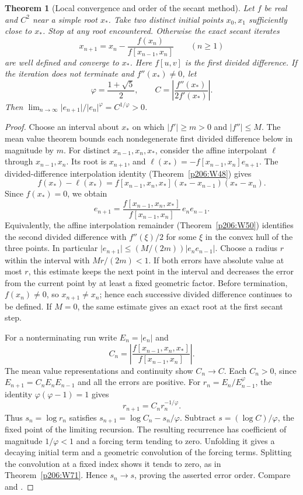 \documentclass[11pt,oneside,openany]{book}
\theoremstyle{plain}
\newtheorem{theorem}{Theorem}[chapter]
\theoremstyle{definition}
\theoremstyle{remark}
\begin{document}
\begin{theorem}[Local convergence and order of the secant method]\label{p206:W75}
Let \(f\) be real and \(C^2\) near a simple root \(x_*\).
Take two distinct initial points \(x_0,x_1\) sufficiently close to
\(x_*\). Stop at any root encountered. Otherwise the exact
secant iterates
\[
 x_{n+1}=x_n-\frac{f(x_n)}{f[x_{n-1},x_n]}
 \qquad (n\ge1)
\]
are well defined and converge to \(x_*\). Here \(f[u,v]\) is
the first divided difference. If the iteration does not terminate
and \(f''(x_*)\ne0\), let
\[
 \varphi=\frac{1+\sqrt5}{2},\qquad
 C=\left|\frac{f''(x_*)}{2 f'(x_*)}\right|.
\]
Then
\(\lim_{n\to\infty}\lvert e_{n+1}\rvert/\lvert e_n\rvert^\varphi
 =C^{1/\varphi}>0\).
\end{theorem}
\begin{proof}
Choose an interval about \(x_*\) on which \(\lvert f'\rvert\ge m>0\)
and \(\lvert f''\rvert\le M\). The mean value theorem bounds each
nondegenerate first divided difference below in magnitude by \(m\).
For distinct \(x_{n-1},x_n,x_*\), consider the affine interpolant
\(\ell\) through \(x_{n-1},x_n\). Its root is \(x_{n+1}\), and
\(\ell(x_*)=-f[x_{n-1},x_n]e_{n+1}\).
The divided-difference interpolation identity
(Theorem~\ref{p206:W48}) gives
\[
 f(x_*)-\ell(x_*)
   = f[x_{n-1},x_n,x_*](x_*-x_{n-1})(x_*-x_n).
\]
Since \(f(x_*)=0\), we obtain
\[
 e_{n+1}
 =\frac{f[x_{n-1},x_n,x_*]}{f[x_{n-1},x_n]}\,e_n e_{n-1}.
\]
Equivalently, the affine interpolation remainder
(Theorem~\ref{p206:W50}) identifies the second divided difference
with \(f''(\xi)/2\) for some \(\xi\) in the convex hull of the three
points. In particular
\(\lvert e_{n+1}\rvert\le (M/(2m))\lvert e_n e_{n-1}\rvert\).
Choose a radius \(r\) within the interval with \(Mr/(2m)<1\).
If both errors have absolute value at most \(r\), this estimate
keeps the next point in the interval and decreases the error from
the current point by at least a fixed geometric factor. Before
termination, \(f(x_n)\ne0\), so \(x_{n+1}\ne x_n\); hence each
successive divided difference continues to be defined. If \(M=0\),
the same estimate gives an exact root at the first secant step.

For a nonterminating run write \(E_n=\lvert e_n\rvert\) and
\[
 C_n=\left|\frac{f[x_{n-1},x_n,x_*]}{f[x_{n-1},x_n]}\right|.
\]
The mean value representations and continuity show \(C_n\to C\).
Each \(C_n>0\), since \(E_{n+1}=C_nE_nE_{n-1}\) and all the errors
are positive. For \(r_n=E_n/E_{n-1}^{\varphi}\), the identity
\(\varphi(\varphi-1)=1\) gives
\[
 r_{n+1}=C_n r_n^{-1/\varphi}.
\]
Thus \(s_n=\log r_n\) satisfies
\(s_{n+1}=\log C_n-s_n/\varphi\). Subtract
\(s=(\log C)/\varphi\), the fixed point of the limiting recursion.
The resulting recurrence has coefficient of magnitude \(1/\varphi<1\)
and a forcing term tending to zero. Unfolding it gives a decaying
initial term and a geometric convolution of the forcing terms.
Splitting the convolution at a fixed index shows it tends to zero,
as in Theorem~\ref{p206:W71}. Hence \(s_n\to s\), proving the asserted
error order. Compare \cite[Section~2.3]{persson} and
\cite[Section~4.4]{driscoll}.
\end{proof}
\end{document}
